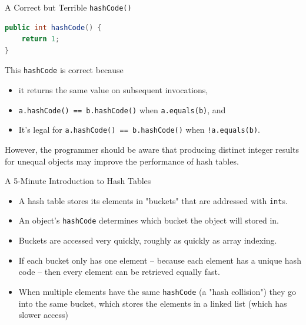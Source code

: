 \documentclass{beamer}
\begin{document}
\begin{frame}[fragile]{A Correct but Terrible {\tt hashCode()}}

\begin{lstlisting}[language=Java]
public int hashCode() {
    return 1;
}
\end{lstlisting}
This {\tt hashCode} is correct because
\begin{itemize}
\item it returns the same value on subsequent invocations,
\item {\tt a.hashCode() == b.hashCode()} when {\tt a.equals(b)}, and
\item It's legal for {\tt a.hashCode() == b.hashCode()} when {\tt !a.equals(b)}.
\end{itemize}
However, the programmer should be aware that producing distinct integer results for unequal objects may improve the performance of hash tables.

\end{frame}

\begin{frame}[fragile]{A 5-Minute Introduction to Hash Tables}

\begin{itemize}
\item A hash table stores its elements in "buckets" that are addressed with {\tt int}s.
\item An object's {\tt hashCode} determines which bucket the object will stored in.
\item Buckets are accessed very quickly, roughly as quickly as array indexing.
\item If each bucket only has one element -- because each element has a unique hash code -- then every element can be retrieved equally fast.
\item When multiple elements have the same {\tt hashCode} (a "hash collision") they go into the same bucket, which stores the elements in a linked list (which has slower access)
\end{itemize}

\end{frame}
\end{document}
